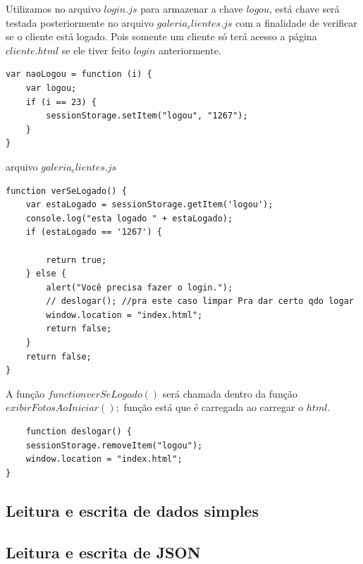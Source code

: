 	Utilizamos no arquivo $login.js$ para armazenar a chave $logou$, está chave será testada posteriormente no arquivo $galeria_clientes.js$ com a finalidade de verificar se o cliente está logado. Pois somente um cliente só terá acesso a página $cliente.html$ se ele tiver feito $login$ anteriormente. 
	
\begin{lstlisting}
var naoLogou = function (i) {
    var logou;
    if (i == 23) {
        sessionStorage.setItem("logou", "1267");
    }
}
\end{lstlisting}

arquivo $galeria_clientes.js$

\begin{lstlisting}
function verSeLogado() {
    var estaLogado = sessionStorage.getItem('logou');
    console.log("esta logado " + estaLogado);
    if (estaLogado == '1267') {

        return true;
    } else {
        alert("Você precisa fazer o login.");
        // deslogar(); //pra este caso limpar Pra dar certo qdo logar 
        window.location = "index.html";
        return false;
    }
    return false;
}
\end{lstlisting}

	A função $function verSeLogado()$ será chamada dentro da função $exibirFotosAoIniciar();$ função está que é carregada ao carregar o $html$.
	
\begin{lstlisting}
	function deslogar() {
    sessionStorage.removeItem("logou");
    window.location = "index.html";
}
\end{lstlisting}
\subsection{Leitura e escrita de dados simples}
\subsection{Leitura e escrita de JSON}

